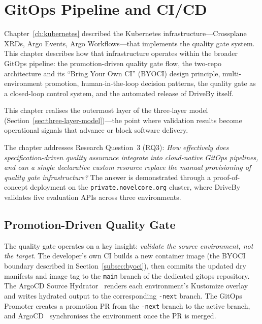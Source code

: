 \chapter{GitOps Pipeline and CI/CD}
\label{ch:workflow}

Chapter~\ref{ch:kubernetes} described the Kubernetes infrastructure---Crossplane XRDs, Argo Events, Argo Workflows---that implements the quality gate system. This chapter describes how that infrastructure operates within the broader GitOps pipeline: the promotion-driven quality gate flow, the two-repo architecture and its ``Bring Your Own CI'' (BYOCI) design principle, multi-environment promotion, human-in-the-loop decision patterns, the quality gate as a closed-loop control system, and the automated release of DriveBy itself.

This chapter realises the outermost layer of the three-layer model (Section~\ref{sec:three-layer-model})---the point where validation results become operational signals that advance or block software delivery.

The chapter addresses Research Question~3 (RQ3): \textit{How effectively does specification-driven quality assurance integrate into cloud-native GitOps pipelines, and can a single declarative custom resource replace the manual provisioning of quality gate infrastructure?} The answer is demonstrated through a proof-of-concept deployment on the \texttt{private.novelcore.org} cluster, where DriveBy validates five evaluation APIs across three environments.

\section{Promotion-Driven Quality Gate}
\label{sec:promotion-driven-gate}

The quality gate operates on a key insight: \textit{validate the source environment, not the target}. The developer's own CI builds a new container image (the BYOCI boundary described in Section~\ref{subsec:byoci}), then commits the updated dry manifests and image tag to the \texttt{main} branch of the dedicated gitops repository. The ArgoCD Source Hydrator~\cite{argocd-hydrator} renders each environment's Kustomize overlay and writes hydrated output to the corresponding \texttt{-next} branch. The GitOps Promoter creates a promotion PR from the \texttt{-next} branch to the active branch, and ArgoCD~\cite{argocd} synchronises the environment once the PR is merged.

